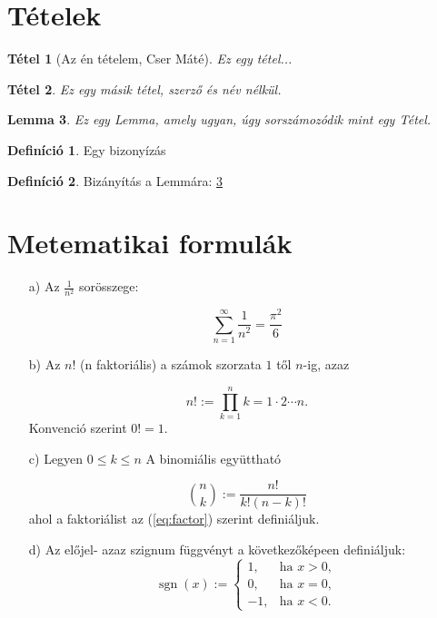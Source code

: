 \documentclass{article}
\author{Cser Máté}
\newtheorem{theorem}{Tétel}
\newtheorem{lemma}[theorem]{Lemma}
\theoremstyle{definition} %
\newtheorem{definition}{Definíció}
\begin{document}
\section{Tételek}
\begin{theorem}[Az én tételem, Cser Máté]
	Ez egy tétel...
\end{theorem}

\begin{theorem}
	Ez egy másik tétel, szerző és név nélkül.
\end{theorem}

\begin{lemma} \label{lem:lemma1}
	Ez egy Lemma, amely ugyan, úgy sorszámozódik mint egy Tétel.
\end{lemma}

\begin{definition}
	Egy bizonyízás
\end{definition}

\begin{definition}
	Bizányítás a Lemmára: \ref{lem:lemma1}
\end{definition}

\section{Metematikai formulák}
\begin{enumerate}
	\item[a)] Az $\frac{1}{n^2}$ sorösszege:

	\begin{equation}
		\sum_{n=1}^{\infty} \frac{1}{n^2} = \frac{\pi^2}{6}
	\end{equation}

	\item[b)] Az $n!$ (n faktoriális) a számok szorzata $1$ től $n$-ig, azaz
	
	\begin{equation}\label{eq:factor}
		n! := \prod_{k=1}^{n} k = 1\cdot 2 \cdots n.
	\end{equation}
	\noindent Konvenció szerint $0! = 1$.

	\item[c)] Legyen $0 \leq k \leq n$ A binomiális együttható
	
	\begin{equation}
		\binom{n}{k} := \frac{n!}{k!(n-k)!}
	\end{equation}
	\noindent ahol a faktoriálist az (\ref{eq:factor}) szerint definiáljuk.

	\item[d)] Az előjel- azaz szignum függvényt a következőképeen definiáljuk:
	\begin{equation}
		\operatorname{sgn}(x) := \begin{cases}
			1, & \text{ha } x > 0, \\
			0, & \text{ha } x = 0, \\
			-1, & \text{ha } x < 0.
		\end{cases}
	\end{equation}
\end{enumerate}
\end{document}
